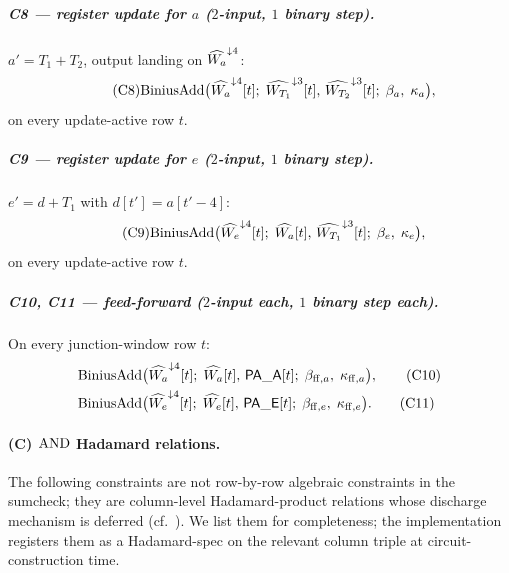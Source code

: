 \subparagraph{C8 — register update for $a$ ($2$-input, $1$ binary step).}
$a' = T_1 + T_2$, output landing on $\widehat{W_a}^{\downarrow 4}$:
\begin{equation}\tag{C8}\label{con:mod-a}
\mathrm{BiniusAdd}\bigl(
    \widehat{W_a}^{\downarrow 4}[t];\;
    \widehat{W_{T_1}}^{\downarrow 3}[t],\, \widehat{W_{T_2}}^{\downarrow 3}[t];\;
    \beta_a,\; \kappa_a\bigr),
\end{equation}
on every update-active row $t$.

\subparagraph{C9 — register update for $e$ ($2$-input, $1$ binary step).}
$e' = d + T_1$ with $d[t'] = a[t'-4]$:
\begin{equation}\tag{C9}\label{con:mod-e}
\mathrm{BiniusAdd}\bigl(
    \widehat{W_e}^{\downarrow 4}[t];\;
    \widehat{W_a}[t],\, \widehat{W_{T_1}}^{\downarrow 3}[t];\;
    \beta_e,\; \kappa_e\bigr),
\end{equation}
on every update-active row $t$.

\subparagraph{C10, C11 — feed-forward ($2$-input each, $1$ binary step each).}
On every junction-window row $t$:
\begin{align}
\mathrm{BiniusAdd}\bigl(
    &\widehat{W_a}^{\downarrow 4}[t];\;
    \widehat{W_a}[t],\, \mathsf{PA\_A}[t];\;
    \beta_{\mathrm{ff},a},\; \kappa_{\mathrm{ff},a}\bigr), \tag{C10}\label{con:ff-a}\\
\mathrm{BiniusAdd}\bigl(
    &\widehat{W_e}^{\downarrow 4}[t];\;
    \widehat{W_e}[t],\, \mathsf{PA\_E}[t];\;
    \beta_{\mathrm{ff},e},\; \kappa_{\mathrm{ff},e}\bigr). \tag{C11}\label{con:ff-e}
\end{align}


\paragraph{(C) $\operatorname{AND}$ Hadamard relations.}

The following constraints are not row-by-row algebraic constraints in
the sumcheck; they are column-level Hadamard-product relations whose
discharge mechanism is deferred (cf.\ ). We
list them for completeness; the implementation registers them as a
Hadamard-spec on the relevant column triple at circuit-construction
time.

